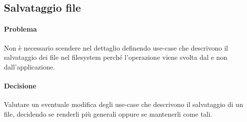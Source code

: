 \subsection{Salvataggio file}
\paragraph{Problema} Non è necessario scendere nel dettaglio definendo use-case che descrivono il salvataggio dei file nel filesystem perché l'operazione viene svolta dal  e non dall'applicazione.
\paragraph{Decisione} Valutare un eventuale modifica degli use-case che descrivono il salvataggio di un file, decidendo se renderli più generali oppure se mantenerli come tali.
